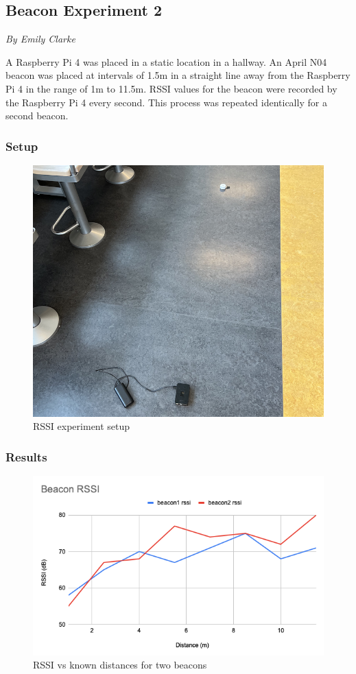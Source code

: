 \documentclass[12pt]{report}
\newcommand{\sectionAuthor}[1]{{\small\vspace{-1em}\textit{#1}}\bigskip\par}
\begin{document}
\subsection{Beacon Experiment 2}
\label{BeaconExperiment2}
\sectionAuthor{By Emily Clarke}
A Raspberry Pi 4 was placed in a static location in a hallway. An April N04 beacon was placed at intervals of 1.5m in a straight line away from the Raspberry Pi 4 in the range of 1m to 11.5m. RSSI values for the beacon were recorded by the Raspberry Pi 4 every second. This process was repeated identically for a second beacon.
\subsubsection{Setup}
\begin{figure}[H]
    \centering
    \includegraphics[scale=0.24]{images/rssi-experiment-setup.png}
    \caption{RSSI experiment setup}
    \label{RSSI Experiment Setup}
\end{figure}
\subsubsection{Results}
\begin{figure}[H]
    \centering
    \includegraphics[scale=0.7]{images/rssi-experiment.png}
    \caption{RSSI vs known distances for two beacons}
    \label{RSSI Experiment Plot}
\end{figure}
\end{document}
